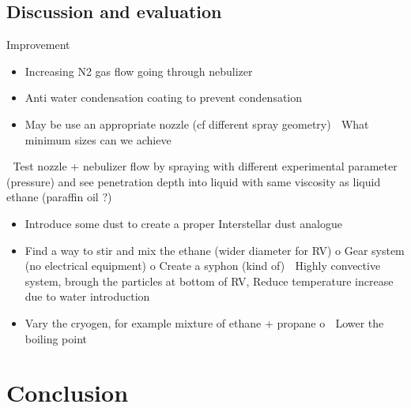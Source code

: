 \documentclass[letterpaper,10pt,english]{jupyterBook}
\begin{document}
\section{Discussion and evaluation}
\label{\detokenize{Chapter7/Chapter7:discussion-and-evaluation}}
\sphinxAtStartPar
Improvement
\begin{itemize}
\item {} 
\sphinxAtStartPar
Increasing N2 gas flow going through nebulizer

\item {} 
\sphinxAtStartPar
Anti water condensation coating to prevent condensation

\item {} 
\sphinxAtStartPar
May be use an appropriate nozzle (cf different spray geometry)  What minimum sizes can we achieve

\end{itemize}

\sphinxAtStartPar
	Test nozzle + nebulizer flow by spraying with different experimental parameter (pressure) and see penetration depth into liquid with same viscosity as liquid ethane (paraffin oil ?)
\begin{itemize}
\item {} 
\sphinxAtStartPar
Introduce some dust to create a proper Interstellar dust analogue

\item {} 
\sphinxAtStartPar
Find a way to stir and mix the ethane (wider diameter for RV)
o	Gear system (no electrical equipment)
o	Create a syphon (kind of)  Highly convective system, brough the particles at bottom of RV, Reduce temperature increase due to water introduction

\item {} 
\sphinxAtStartPar
Vary the cryogen, for example mixture of ethane + propane
o	 Lower the boiling point

\end{itemize}

\sphinxstepscope


\chapter{Conclusion}
\label{\detokenize{Conclusion/Conclusion:conclusion}}\label{\detokenize{Conclusion/Conclusion::doc}}






\renewcommand{\indexname}{Index}
\printindex
\end{document}
